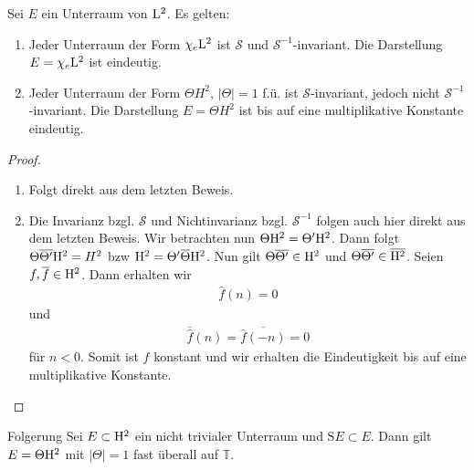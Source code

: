 \begin{lemma}\label{skript:1.2}
Sei $E$ ein Unterraum von $\mathrm{L}^2$.
Es gelten:
\begin{enumerate}[label=\textbf{(\arabic*)}]
\item
Jeder Unterraum der Form $\chi_e \mathrm{L}^2$ ist $\mathscr{S}$ und $\mathscr{S}^{-1}$-invariant.
Die Darstellung $E = \chi_e \mathrm{L}^2$ ist eindeutig.

\item
Jeder Unterraum der Form $\Theta H^2$, $| \Theta | = 1$ f.ü. ist $\mathscr{S}$-invariant, jedoch nicht $\mathscr{S}^{-1}$-invariant.
Die Darstellung $E = \Theta H^2$ ist bis auf eine multiplikative Konstante eindeutig. 

\end{enumerate}
\end{lemma}

\begin{proof}
\begin{enumerate}[label=\textbf{(\arabic*)}]
\item
Folgt direkt aus dem letzten Beweis.
\item
Die Invarianz bzgl. $\mathscr{S}$ und Nichtinvarianz bzgl. $\mathscr{S}^{-1}$ folgen auch hier direkt aus dem letzten Beweis.
Wir betrachten nun $\Theta \mathrm{H}^2 = \Theta^\prime \mathrm{H}^2$.
Dann folgt $\Theta \overline{\Theta^\prime} \mathrm{H}^2 = H^2$
bzw $\mathrm{H}^2 = \Theta^\prime \overline{\Theta} \mathrm{H}^2$.
Nun gilt $\Theta \overline{\Theta^\prime} \in \mathrm{H}^2$ und $\Theta \overline{\Theta^\prime} \in \overline{\mathrm{H}^2}$.
Seien $f , \overline{f} \in \mathrm{H}^2$.
Dann erhalten wir 
\begin{align*}
\hat{f}(n) = 0
\end{align*}
und
\begin{align*}
\overline{\hat{f}}(n) = \overline{\hat{f}(-n)} = 0
\end{align*}
für $n < 0$. Somit ist $f$ konstant und wir erhalten die Eindeutigkeit bis auf eine multiplikative Konstante.
\end{enumerate}
\end{proof}

\begin{genericthm}{Folgerung}\label{skript:1.3}
Sei $E \subset \mathrm{H}^2$ ein nicht trivialer Unterraum und $\mathrm{S}E \subset E$.
Dann gilt $E = \Theta \mathrm{H}^2$ mit $| \Theta | = 1$ fast überall auf $\mathbb{T}$.
\end{genericthm}

